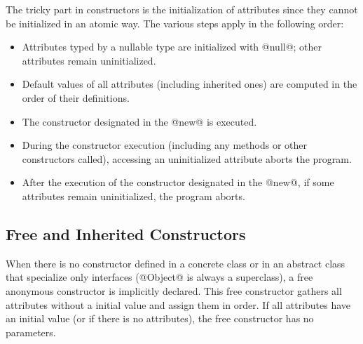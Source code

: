 The tricky part in constructors is the initialization of attributes since they cannot be initialized in an atomic way.
The various steps apply in the following order:
\begin{itemize}
\item Attributes typed by a nullable type are initialized with @null@; other attributes remain uninitialized.
\item Default values of all attributes (including inherited ones) are computed in the order of their definitions.
\item The constructor designated in the @new@ is executed.
\item During the constructor execution (including any methods or other constructors called), accessing an uninitialized attribute aborts the program.
\item After the execution of the constructor designated in the @new@, if some attributes remain uninitialized, the program aborts.
\end{itemize}

\begin{comment}
@isset@ can be used to avoid aborting during the construction.
It checks if an attribute is defined.
\begin{lst}
class Foo
	var x: Int
	fun safe_x: nullable Int
	do
		if isset self.x then
			return self.x
		else
			return null
		end
	end
	init
	do
		print safe_x or else 0 # outputs 0
		# "print x" would have aborted the program
		self.x = 5
		print safe_x or else 0 # outputs "5"
		print x # outputs "5". It is safe.
	end
end
var f = new Foo
\end{lst}
\end{comment}

\subsection{Free and Inherited Constructors}\label{init inheritance}

When there is no constructor defined in a concrete class or in an abstract class that specialize only interfaces (@Object@ is always a superclass), a free anonymous constructor is implicitly declared.
This free constructor gathers all attributes without a initial value and assign them in order.
If all attributes have an initial value (or if there is no attributes), the free constructor has no parameters.


